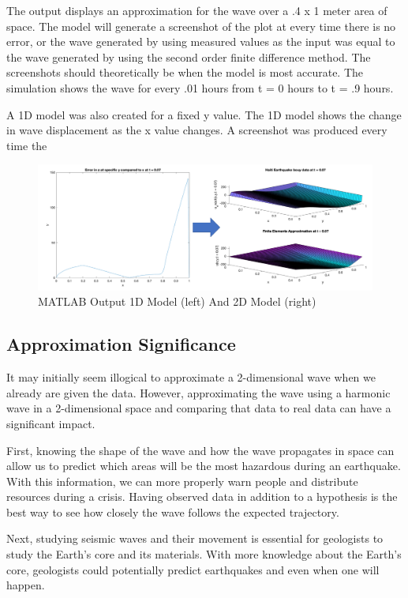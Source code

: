 \documentclass[conf]{new-aiaa}
\begin{document}
The output displays an approximation for the wave over a .4 x 1 meter area of space. The model will generate a screenshot of the plot at every time there is no error, or the wave generated by using measured values as the input was equal to the wave generated by using the second order finite difference method. The screenshots should theoretically be when the model is most accurate. The simulation shows the wave for every .01 hours from t = 0 hours to t = .9 hours. 

A 1D model was also created for a fixed y value. The 1D model shows the change in wave displacement as the x value changes. A screenshot was produced every time the 

\begin{figure}[H]
    \begin{center}
    \includegraphics [width= 1\linewidth]{figures/1d2d.png}
    \caption{MATLAB Output 1D Model (left) And 2D Model (right)}
    \label{fig_1d2d}
    \end{center}
\end{figure}



\subsection{Approximation Significance}
It may initially seem illogical to approximate a 2-dimensional wave when we already are given the data. However, approximating the wave using a harmonic wave in a 2-dimensional space and comparing that data to real data can have a significant impact.

First, knowing the shape of the wave and how the wave propagates in space can allow us to predict which areas will be the most hazardous during an earthquake. With this information, we can more properly warn people and distribute resources during a crisis. Having observed data in addition to a hypothesis is the best way to see how closely the wave follows the expected trajectory.

Next, studying seismic waves and their movement is essential for geologists to study the Earth's core and its materials. With more knowledge about the Earth's core, geologists could potentially predict earthquakes and even when one will happen. 
\end{document}
